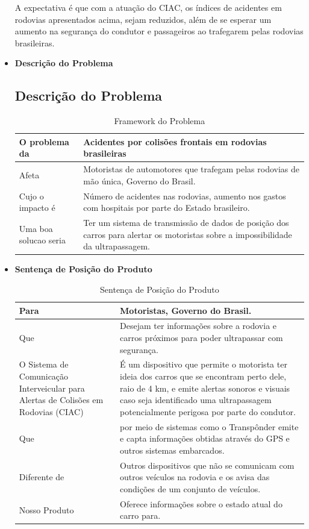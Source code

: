 \begin{itemize}
A expectativa é que com a atuação do CIAC, os índices de acidentes em rodovias apresentados acima, sejam reduzidos, além de se esperar um aumento na segurança do condutor e passageiros ao trafegarem pelas rodovias brasileiras.

  \item  \textbf{Descrição do Problema}


\subsection{Descrição do Problema}
\begin{table}[ht]
\caption{Framework do Problema}
\centering
\begin{tabular}{| l |  p{7cm} |}
\hline
O problema da & Acidentes por colisões frontais em rodovias brasileiras  \\
\hline
Afeta & Motoristas de automotores que trafegam pelas rodovias de mão única, Governo do Brasil. \\
\hline
Cujo o impacto é & Número de acidentes nas rodovias, aumento nos gastos com hospitais por parte do Estado brasileiro.\\
\hline
Uma boa solucao seria & Ter um sistema de transmissão de dados de posição dos carros para alertar os motoristas sobre a impossibilidade da ultrapassagem. \\
\hline
\end{tabular}
\end{table}


\item \textbf{Sentença de Posição do Produto}

\begin{table}[h!]
\caption{Sentença de Posição do Produto}
\centering
\begin{tabular}{| p{5cm} |  p{7cm} |}
\hline
Para & Motoristas, Governo do Brasil. \\
\hline
Que & Desejam ter informações sobre a rodovia e carros próximos para poder ultrapassar com segurança. \\
\hline
O Sistema de Comunicação Interveicular para Alertas de Colisões em Rodovias (CIAC) &É um dispositivo que permite o motorista ter ideia dos carros que se encontram perto dele, raio de 4 km, e emite alertas sonoros e visuais caso seja identificado uma ultrapassagem potencialmente perigosa por parte do condutor. \\
\hline
Que & por meio de sistemas como o Transpônder emite e capta informações obtidas através do GPS e outros sistemas embarcados. \\
\hline
Diferente de & Outros dispositivos que não se comunicam com outros veículos na rodovia e os avisa das condições de um conjunto de veículos.  \\
\hline
Nosso Produto & Oferece informações sobre o estado atual do carro para. \\
\hline
\end{tabular}
\end{table}



\end{itemize}
